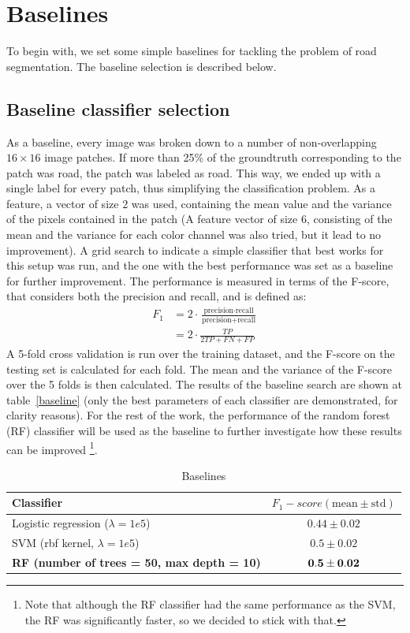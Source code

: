 \documentclass[10pt,conference,compsocconf]{IEEEtran}
\begin{document}
	\section{Baselines}
	To begin with, we set some simple baselines for tackling the problem of road segmentation. The baseline selection is described below.
	\subsection{Baseline classifier selection}
	\label{baseline_selection}
	As a baseline, every image was broken down to a number of non-overlapping $16 \times 16$ image patches. If more than 25\% of the groundtruth corresponding to the patch was road, the patch was labeled as road. This way, we ended up with a single label for every patch, thus simplifying the classification problem. As a feature, a vector of size 2 was used, containing the mean value and the variance of the pixels contained in the patch (A feature vector of size 6, consisting of the mean and the variance for each color channel was also tried, but it lead to no improvement). A grid search to indicate a simple classifier that best works for this setup was run, and the one with the best performance was set as a baseline for further improvement.	
	The performance is measured in terms of the F-score, that considers both the precision and recall, and is defined as:
	\begin{align*}
	F_1 & = 2\cdot \frac{\text{precision}\cdot \text{recall}}{\text{precision} + \text{recall}} \\
	& = 2 \cdot \frac{TP}{2TP + FN + FP}
	\end{align*}
	A 5-fold cross validation is run over the training dataset, and the F-score on the testing set is calculated for each fold. The mean and the variance of the F-score over the 5 folds is then calculated. The results of the baseline search are shown at table~\ref{baseline} (only the best parameters of each classifier are demonstrated, for clarity reasons). For the rest of the work, the performance of the random forest (RF) classifier will be used as the baseline to further investigate how these results can be improved \footnote{Note that although the RF classifier had the same performance as the SVM, the RF was significantly faster, so we decided to stick with that.}.
		\begin{table}[h]
		\centering
		\begin{tabular}{p{} c}		
			\textbf{Classifier} &  \textbf{$F_1-score (\text{mean}\pm \text{std})$}\\
			\hline \hline
			Logistic regression ($\lambda = 1e5$) & $0.44 \pm 0.02$ \\ \hline
			SVM (rbf kernel, $\lambda = 1e5$) & $0.5 \pm 0.02$ \\ \hline
			\textbf{RF (number of trees = 50, max depth = 10)} & $\bf{0.5 \pm 0.02}$ \\
			\hline
		\end{tabular}
		\label{baselines}
		\caption{Baselines}
		\end{table}
\end{document}
